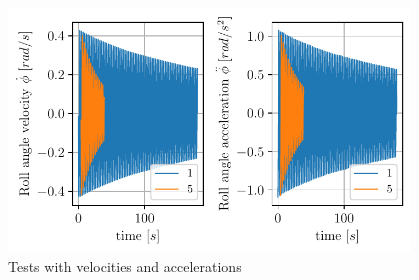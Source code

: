 \begin{figure}[H]
\begin{center}\includegraphics[width = 0.95\textwidth]{figures/vel_acc.pdf}\end{center}
\vspace{-0.7cm}
\caption{Tests with velocities and accelerations}
\label{fig:vel_acc}
\end{figure}
